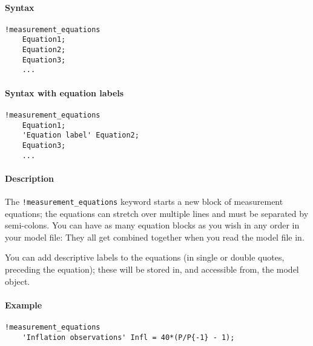 


	\paragraph{Syntax}

\begin{verbatim}
!measurement_equations
    Equation1;
    Equation2;
    Equation3;
    ...
\end{verbatim}

\paragraph{Syntax with equation
labels}

\begin{verbatim}
!measurement_equations
    Equation1;
    'Equation label' Equation2;
    Equation3;
    ...
\end{verbatim}

\paragraph{Description}

The \texttt{!measurement\_equations} keyword starts a new block of
measurement equations; the equations can stretch over multiple lines and
must be separated by semi-colons. You can have as many equation blocks
as you wish in any order in your model file: They all get combined
together when you read the model file in.

You can add descriptive labels to the equations (in single or double
quotes, preceding the equation); these will be stored in, and accessible
from, the model object.

\paragraph{Example}

\begin{verbatim}
!measurement_equations
    'Inflation observations' Infl = 40*(P/P{-1} - 1);
\end{verbatim}



